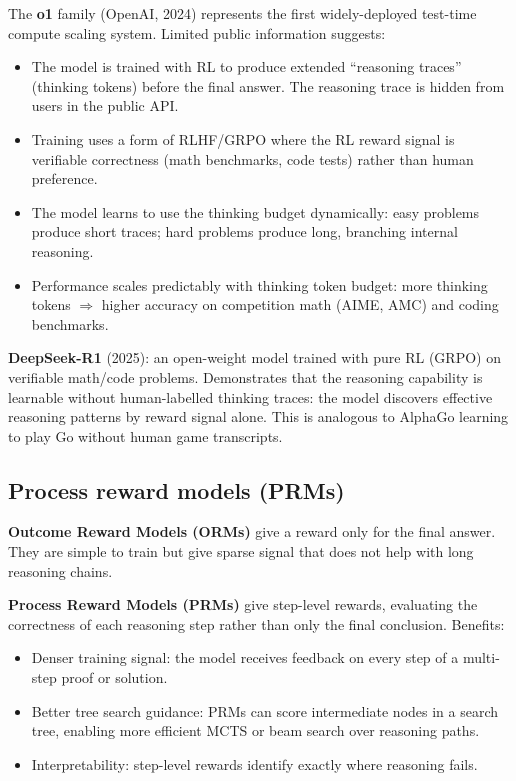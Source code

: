 The \textbf{o1} family (OpenAI, 2024) represents the first widely-deployed test-time
compute scaling system. Limited public information suggests:

\begin{itemize}
  \item The model is trained with RL to produce extended ``reasoning traces'' (thinking
    tokens) before the final answer. The reasoning trace is hidden from users in the
    public API.
  \item Training uses a form of RLHF/GRPO where the RL reward signal is verifiable
    correctness (math benchmarks, code tests) rather than human preference.
  \item The model learns to use the thinking budget dynamically: easy problems produce
    short traces; hard problems produce long, branching internal reasoning.
  \item Performance scales predictably with thinking token budget: more thinking tokens
    $\Rightarrow$ higher accuracy on competition math (AIME, AMC) and coding benchmarks.
\end{itemize}

\textbf{DeepSeek-R1} (2025): an open-weight model trained with pure RL (GRPO) on
verifiable math/code problems. Demonstrates that the reasoning capability is learnable
without human-labelled thinking traces: the model discovers effective reasoning patterns
by reward signal alone. This is analogous to AlphaGo learning to play Go without human
game transcripts.

\subsection{Process reward models (PRMs)}

\textbf{Outcome Reward Models (ORMs)} give a reward only for the final answer. They are
simple to train but give sparse signal that does not help with long reasoning chains.

\textbf{Process Reward Models (PRMs)} give step-level rewards, evaluating the
correctness of each reasoning step rather than only the final conclusion. Benefits:
\begin{itemize}
  \item Denser training signal: the model receives feedback on every step of a
    multi-step proof or solution.
  \item Better tree search guidance: PRMs can score intermediate nodes in a search
    tree, enabling more efficient MCTS or beam search over reasoning paths.
  \item Interpretability: step-level rewards identify exactly where reasoning fails.
\end{itemize}

